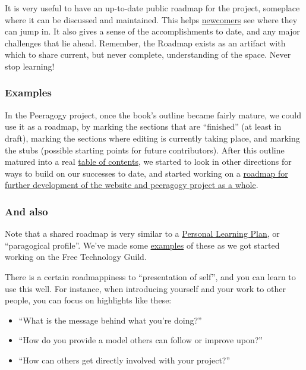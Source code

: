 It is very useful to have an up-to-date public roadmap for the project,
someplace where it can be discussed and maintained. This helps
\href{http://peeragogy.org/practice/heuristics/newcomer/}{newcomers} see
where they can jump in. It also gives a sense of the accomplishments to
date, and any major challenges that lie ahead. Remember, the Roadmap
exists as an artifact with which to share current, but never complete,
understanding of the space. Never stop learning!

\subsubsection{Examples}

In the Peeragogy project, once the book's outline became fairly mature,
we could use it as a roadmap, by marking the sections that are
``finished'' (at least in draft), marking the sections where editing is
currently taking place, and marking the stubs (possible starting points
for future contributors). After this outline matured into a real
\href{http://peeragogy.org/table-of-contents/}{table of contents}, we
started to look in other directions for ways to build on our successes
to date, and started working on a
\href{http://peeragogy.org/peeragogy-org-roadmap/}{roadmap for further
development of the website and peeragogy project as a whole}.

\subsubsection{And also}

Note that a shared roadmap is very similar to a
\href{http://peeragogy.org/to-peeragogy/personal-learning-plan/}{Personal
Learning Plan}, or ``paragogical profile''. We've made some
\href{http://campus.ftacademy.org/wiki/index.php/Free\_Technology\_Guild\#Learning\_design}{examples}
of these as we got started working on the Free Technology Guild.

There is a certain roadmappiness to ``presentation of self'', and you
can learn to use this well. For instance, when introducing yourself and
your work to other people, you can focus on highlights like these:

\begin{itemize}
\item
  ``What is the message behind what you're doing?''
\item
  ``How do you provide a model others can follow or improve upon?''
\item
  ``How can others get directly involved with your project?''
\end{itemize}
